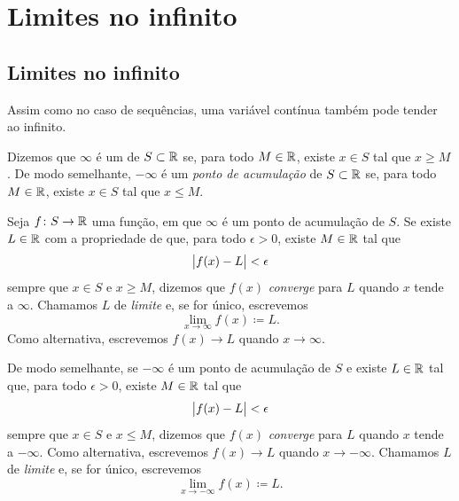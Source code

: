 
\sectionnewpage
\section{Limites no infinito}
\label{sec:limitatinf}



\subsection{Limites no infinito}

Assim como no caso de sequências, uma variável contínua também pode tender ao infinito.

\begin{defn}
Dizemos que $\infty$ é um \emph{} de $S \subset {\mathbb{R}}$ se, para todo
$M \in {\mathbb{R}}$, existe $x \in S$ tal que $x \geq M$. De modo semelhante,
$-\infty$ é um \emph{ponto de acumulação} de $S \subset {\mathbb{R}}$ se, para todo
$M \in {\mathbb{R}}$, existe $x \in S$ tal que $x \leq M$.

%
Seja $f \colon S \to {\mathbb{R}}$ uma função, em que
$\infty$ é um ponto de acumulação de $S$.
Se existe $L \in {\mathbb{R}}$
com a propriedade de que, para todo $\epsilon > 0$, existe $M \in {\mathbb{R}}$ tal que
\begin{equation*}
\bigl\lvert {f(x) - L} \bigr\rvert < \epsilon
\end{equation*}
sempre que $x \in S$ e $x \geq M$, dizemos que $f(x)$
\emph{converge} para $L$
quando $x$ tende a $\infty$. Chamamos $L$ de \emph{limite}
e, se for único, escrevemos
\begin{equation*}
\lim_{x \to \infty} f(x) \coloneqq L .
\end{equation*}
Como alternativa, escrevemos $f(x) \to L$ quando $x \to \infty$.

De modo semelhante, se $-\infty$ é um ponto de acumulação de $S$
e existe $L \in {\mathbb{R}}$
tal que, para todo $\epsilon > 0$, existe $M \in {\mathbb{R}}$ tal que
\begin{equation*}
\bigl\lvert {f(x) - L} \bigr\rvert < \epsilon
\end{equation*}
sempre que $x \in S$ e $x \leq M$, dizemos que $f(x)$ \emph{converge} para $L$
quando $x$ tende a $-\infty$.
Como alternativa, escrevemos $f(x) \to L$ quando $x \to -\infty$.
Chamamos $L$ de \emph{limite} e, se for único, escrevemos
\begin{equation*}
\lim_{x \to -\infty} f(x) \coloneqq L .
\end{equation*}
\end{defn}


